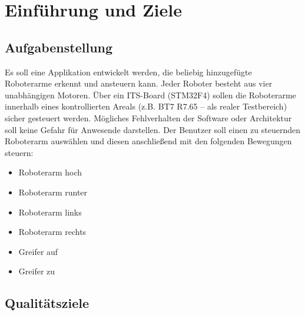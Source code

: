 \chapter{Einführung und Ziele}

\section{Aufgabenstellung}

Es soll eine Applikation entwickelt werden, die beliebig hinzugefügte Roboterarme erkennt und ansteuern kann. Jeder Roboter besteht aus vier unabhängigen Motoren. Über ein ITS-Board (STM32F4) sollen die Roboterarme innerhalb eines kontrollierten Areals (z.B. BT7 R7.65 – als realer Testbereich) sicher gesteuert werden. Mögliches Fehlverhalten der Software oder Architektur soll keine Gefahr für Anwesende darstellen. Der Benutzer soll einen zu steuernden Roboterarm auswählen und diesen anschließend mit den folgenden Bewegungen steuern:

\begin{itemize}
	\item Roboterarm hoch
	\item Roboterarm runter
	\item Roboterarm links
	\item Roboterarm rechts
	\item Greifer auf
	\item Greifer zu
	
\end{itemize}


\newpage
\section{Qualitätsziele}

